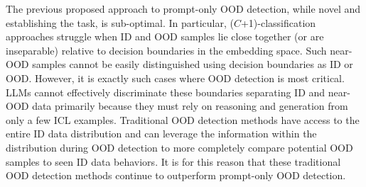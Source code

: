 The previous proposed approach to prompt-only OOD detection, while novel and establishing the task, is sub-optimal. In particular, ($C$+1)-classification approaches struggle when ID and OOD samples lie close together (or are inseparable) relative to decision boundaries in the embedding space. Such near-OOD samples cannot be easily distinguished using decision boundaries as ID or OOD. However, it is exactly such cases where OOD detection is most critical. LLMs cannot effectively discriminate these boundaries separating ID and near-OOD data primarily because they must rely on reasoning and generation from only a few ICL examples. Traditional OOD detection methods have access to the entire ID data distribution and can leverage the information within the distribution during OOD detection to more completely compare potential OOD samples to seen ID data behaviors. It is for this reason that these traditional OOD detection methods continue to outperform prompt-only OOD detection.

